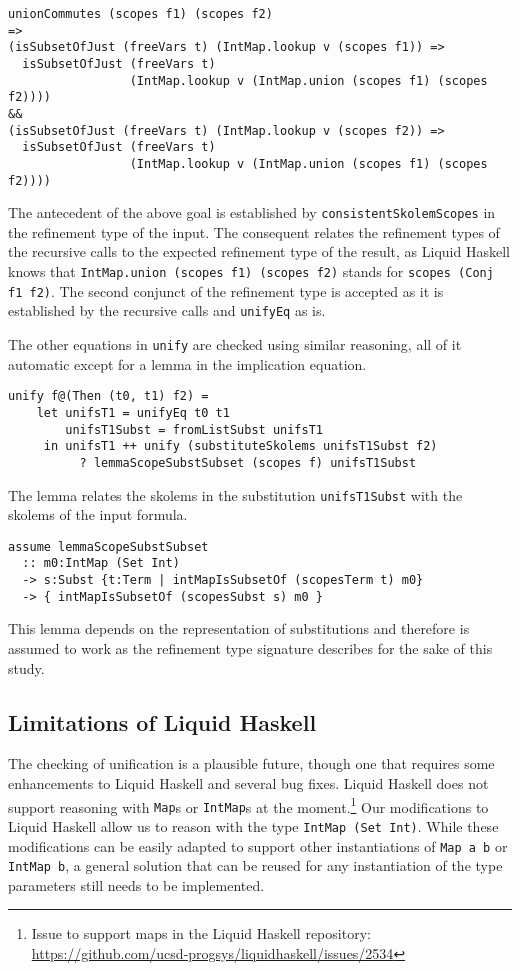 \documentclass[acmtog, anonymous]{acmart}
\newcommand{\tc}[1]{{\small\texttt{#1}}}
\begin{document}
\begin{verbatim}
unionCommutes (scopes f1) (scopes f2)
=>
(isSubsetOfJust (freeVars t) (IntMap.lookup v (scopes f1)) =>
  isSubsetOfJust (freeVars t)
                 (IntMap.lookup v (IntMap.union (scopes f1) (scopes f2))))
&&
(isSubsetOfJust (freeVars t) (IntMap.lookup v (scopes f2)) =>
  isSubsetOfJust (freeVars t)
                 (IntMap.lookup v (IntMap.union (scopes f1) (scopes f2))))
\end{verbatim}

The antecedent of the above goal is established by \tc{consistent\-Skolem\-Scopes}
in the refinement type of the input. The consequent relates the refinement types
of the recursive calls to the expected refinement type of the result, as Liquid
Haskell knows that \tc{IntMap.\allowbreak union (scopes f1) (scopes f2)} stands for
\tc{scopes (Conj f1 f2)}. The second conjunct of the refinement type
is accepted as it is established by the recursive calls and \tc{unifyEq}
as is.

The other equations in \tc{unify} are checked using similar reasoning, all of it
automatic except for a lemma in the implication equation.

\begin{verbatim}
unify f@(Then (t0, t1) f2) =
    let unifsT1 = unifyEq t0 t1
        unifsT1Subst = fromListSubst unifsT1
     in unifsT1 ++ unify (substituteSkolems unifsT1Subst f2)
          ? lemmaScopeSubstSubset (scopes f) unifsT1Subst
\end{verbatim}

The lemma relates the skolems in the substitution \tc{unifsT1Subst}
with the skolems of the input formula.

\begin{verbatim}
assume lemmaScopeSubstSubset
  :: m0:IntMap (Set Int)
  -> s:Subst {t:Term | intMapIsSubsetOf (scopesTerm t) m0}
  -> { intMapIsSubsetOf (scopesSubst s) m0 }
\end{verbatim}

This lemma depends on the representation of substitutions and therefore is
assumed to work as the refinement type signature describes for the sake of
this study.


\subsection{Limitations of Liquid Haskell}
\label{limitations-of-liquid-haskell}

The checking of unification is a plausible future, though one that requires
some enhancements to Liquid Haskell and several bug fixes. Liquid Haskell does
not support reasoning with \tc{Map}s or \tc{IntMap}s at the
moment.\footnote{Issue to support maps in the Liquid Haskell repository: \url{https://github.com/ucsd-progsys/liquidhaskell/issues/2534}} Our
modifications to Liquid Haskell allow us to reason with the type
\tc{IntMap (Set Int)}. While these modifications can be easily adapted to
support other instantiations of \tc{Map a b} or \tc{IntMap b}, a general
solution that can be reused for any instantiation of the type parameters still
needs to be implemented.
\end{document}
